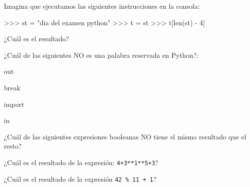 \begin{ejercicio} Imagina que ejecutamos las siguientes instrucciones en la consola:

\begin{python}
>>> st = "dia del examen python"
>>> t = st
>>> t[len(st) - 4]
\end{python}

¿Cuál es el resultado?

\begin{choices}
    \choice {}   %
    \choice {}
    \choice {}
    \choice \pythoninline{ }
\end{choices}
\end{ejercicio}


\begin{ejercicio} ¿Cuál de las siguientes NO es una palabra reservada en Python?:

\begin{choices}
 \choice out   %
 
\choice break

\choice import

\choice  in
 
 \end{choices}     


\end{ejercicio}



\begin{ejercicio} ¿Cuál de las siguientes expresiones booleanas NO tiene el mismo resultado que el resto?
\begin{choices}
    \choice {}    %
    \choice  {}
    \choice {}
    \choice {}
\end{choices}

\end{ejercicio}

\begin{ejercicio} ¿Cuál es el resultado de la expresión: \verb|4+3**1**5+3|?

\begin{choices}
\end{choices}

\end{ejercicio}


\begin{ejercicio} ¿Cuál es el resultado de la expresión \verb|42 % 11 + 1|?

\begin{choices}
\end{choices}

\end{ejercicio}



